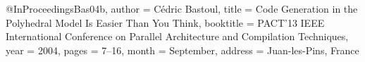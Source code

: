 @InProceedings{Bas04b,
 author = {C\'{e}dric Bastoul},
 title = {Code Generation in the Polyhedral Model Is Easier Than You Think},
 booktitle = {PACT'13 IEEE International Conference on Parallel Architecture
              and Compilation Techniques},
 year =	2004,
 pages = {7--16},
 month = {September},
 address = {Juan-les-Pins, France}
}
